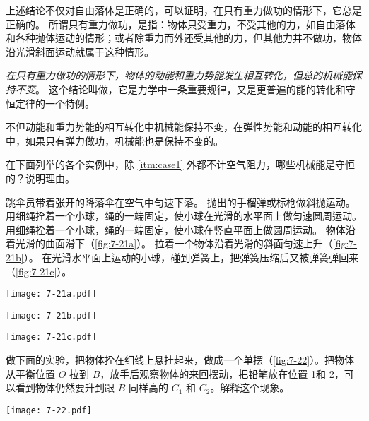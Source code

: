 上述结论不仅对自由落体是正确的，可以证明，在只有重力做功的情形下，它总是正确的。
所谓只有重力做功，是指：物体只受重力，不受其他的力，如自由落体和各种抛体运动的情形；或者除重力而外还受其他的力，但其他力并不做功，物体沿光滑斜面运动就属于这种情形。

\emph{在只有重力做功的情形下，物体的动能和重力势能发生相互转化，但总的机械能保持不变}。
这个结论叫做，它是力学中一条重要规律，又是更普遍的能的转化和守恒定律的一个特例。

不但动能和重力势能的相互转化中机械能保持不变，在弹性势能和动能的相互转化中，如果只有弹力做功，机械能也是保持不变的。

\begin{Practice}
\begin{question}
  \item 在下面列举的各个实例中，除 \ref{itm:case1} 外都不计空气阻力，哪些机械能是守恒的？说明理由。
  \begin{tasks}
    \task\label{itm:case1} 跳伞员带着张开的降落伞在空气中匀速下落。
    \task 抛出的手榴弹或标枪做斜抛运动。
    \task 用细绳拴着一个小球，绳的一端固定，使小球在光滑的水平面上做匀速圆周运动。
    \task 用细绳拴着一个小球，绳的一端固定，使小球在竖直平面上做圆周运动。
    \task 物体沿着光滑的曲面滑下（\cref{fig:7-21a}）。
    \task 拉着一个物体沿着光滑的斜面匀速上升（\cref{fig:7-21b}）。
    \task 在光滑水平面上运动的小球，碰到弹簧上，把弹簧压缩后又被弹簧弹回来（\cref{fig:7-21c}）。
  \end{tasks}
\begin{figurehere}
  \nextfloat
  \begin{minipage}{\linewidth}\centering
    \begin{minipage}{0.33\linewidth}\centering
      \texttt{[image: 7-21a.pdf]}
      \subcaption{}\label{fig:7-21a}
    \end{minipage}%
    \begin{minipage}{0.33\linewidth}\centering
      \texttt{[image: 7-21b.pdf]}
      \subcaption{}\label{fig:7-21b}
    \end{minipage}%
    \begin{minipage}{0.33\linewidth}\centering
      \texttt{[image: 7-21c.pdf]}
      \subcaption{}\label{fig:7-21c}
    \end{minipage}
    \caption{}\label{fig:7-21}
  \end{minipage}
\end{figurehere}
    \item  做下面的实验，把物体拴在细线上悬挂起来，做成一个单摆（\cref{fig:7-22}）。把物体从平衡位置 $O$ 拉到 $B$，放手后观察物体的来回摆动，把铅笔放在位置 1和 2，可以看到物体仍然要升到跟 $B$ 同样高的 $C_1$ 和 $C_2$。解释这个现象。
\begin{figurehere}
  \begin{minipage}{\linewidth}\centering
    \texttt{[image: 7-22.pdf]}
    \caption{}\label{fig:7-22}
  \end{minipage}
\end{figurehere}
\end{question}
\end{Practice}

